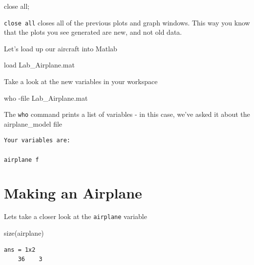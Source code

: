 \documentclass[
]{book}
\newenvironment{Shaded}{\begin{snugshade}}{\end{snugshade}}
\newcommand{\FunctionTok}[1]{\textcolor[rgb]{0.00,0.00,0.00}{#1}}
\newcommand{\NormalTok}[1]{#1}
\newcommand{\SpecialCharTok}[1]{\textcolor[rgb]{0.00,0.00,0.00}{#1}}
\theoremstyle{definition}
\theoremstyle{definition}
\theoremstyle{definition}
\theoremstyle{definition}
\theoremstyle{remark}
\begin{document}
\begin{Shaded}
\begin{Highlighting}[]
\NormalTok{close all; }
\end{Highlighting}
\end{Shaded}

\texttt{close\ all} closes all of the previous plots and graph windows. This way you know that the plots you see generated are new, and not old data.

Let's load up our aircraft into Matlab

\begin{Shaded}
\begin{Highlighting}[]
\NormalTok{load Lab\_Airplane.mat}
\end{Highlighting}
\end{Shaded}

Take a look at the new variables in your workspace

\begin{Shaded}
\begin{Highlighting}[]
\NormalTok{who }\SpecialCharTok{{-}}\NormalTok{file Lab\_Airplane.mat}
\end{Highlighting}
\end{Shaded}

The \texttt{who} command prints a list of variables - in this case, we've asked it about the airplane\_model file

\begin{verbatim}
Your variables are: 

airplane f
\end{verbatim}

\hypertarget{making-an-airplane}{%
\section{Making an Airplane}\label{making-an-airplane}}

Lets take a closer look at the \texttt{airplane} variable

\begin{Shaded}
\begin{Highlighting}[]
\FunctionTok{size}\NormalTok{(airplane)}
\end{Highlighting}
\end{Shaded}

\begin{verbatim}
ans = 1x2
    36    3
    
\end{verbatim}
\end{document}

